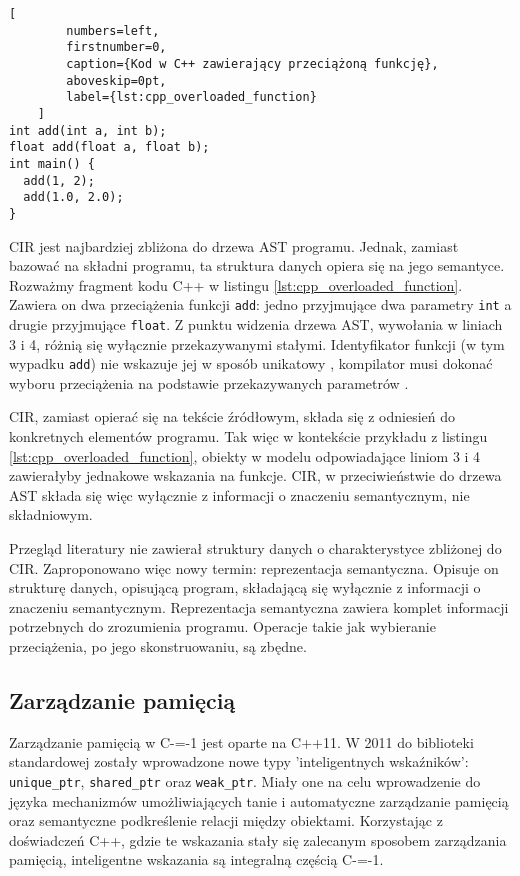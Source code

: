\begin{minipage}{\linewidth}
	\begin{lstlisting}[
		numbers=left,
		firstnumber=0,
		caption={Kod w C++ zawierający przeciążoną funkcję},
		aboveskip=0pt,
		label={lst:cpp_overloaded_function}
	]
int add(int a, int b);
float add(float a, float b);
int main() {
  add(1, 2);
  add(1.0, 2.0);
}
	\end{lstlisting}
\end{minipage}

CIR jest najbardziej zbliżona do drzewa AST programu.
Jednak, zamiast bazować na składni programu, ta struktura danych opiera się na jego semantyce.
Rozważmy fragment kodu C++ w listingu \ref{lst:cpp_overloaded_function}.
Zawiera on dwa przeciążenia funkcji \lstinline{add}: jedno przyjmujące dwa parametry \lstinline{int} a drugie przyjmujące \lstinline{float}.
Z punktu widzenia drzewa AST, wywołania w liniach 3 i 4, różnią się wyłącznie przekazywanymi stałymi.
Identyfikator funkcji (w tym wypadku \lstinline{add}) nie wskazuje jej w sposób unikatowy \cite{ISO:cpp20}, kompilator musi dokonać wyboru przeciążenia na podstawie przekazywanych parametrów \cite{cpp:function_overload_frontend}.

CIR, zamiast opierać się na tekście źródłowym, składa się z odniesień do konkretnych elementów programu.
Tak więc w kontekście przykładu z listingu \ref{lst:cpp_overloaded_function}, obiekty w modelu odpowiadające liniom 3 i 4 zawierałyby jednakowe wskazania na funkcje.
CIR, w przeciwieństwie do drzewa AST składa się więc wyłącznie z informacji o znaczeniu semantycznym, nie składniowym.

Przegląd literatury nie zawierał struktury danych o charakterystyce zbliżonej do CIR.
Zaproponowano więc nowy termin: reprezentacja semantyczna.
Opisuje on strukturę danych, opisującą program, składającą się wyłącznie z informacji o znaczeniu semantycznym.
Reprezentacja semantyczna zawiera komplet informacji potrzebnych do zrozumienia programu.
Operacje takie jak wybieranie przeciążenia, po jego skonstruowaniu, są zbędne.

\subsection{Zarządzanie pamięcią}
Zarządzanie pamięcią w C-=-1 jest oparte na C++11. W 2011 do biblioteki standardowej zostały wprowadzone nowe typy 'inteligentnych wskaźników': \lstinline{unique_ptr}, \lstinline{shared_ptr} oraz \lstinline{weak_ptr}\cite{ISO:2012:III}.
Miały one na celu wprowadzenie do języka mechanizmów umożliwiających tanie i automatyczne zarządzanie pamięcią oraz semantyczne podkreślenie relacji między obiektami.
Korzystając z doświadczeń C++, gdzie te wskazania stały się zalecanym sposobem zarządzania pamięcią\cite{cpp:core_guidelines}, inteligentne wskazania są integralną częścią C-=-1.
